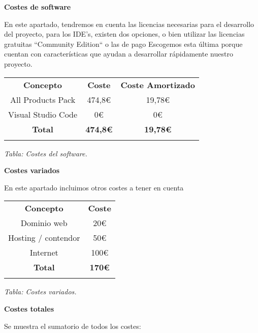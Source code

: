 \textbf{Costes de software}

En este apartado, tendremos en cuenta las licencias necesarias para el desarrollo del proyecto, para los IDE's, existen
dos opciones, o bien utilizar las licencias gratuitas ``Community Edition`` o las de pago\cite{jetbrainsPrecios}
Escogemos esta última porque cuentan con características que ayudan a desarrollar rápidamente nuestro proyecto.

\begin{center}
    \begin{tabular}{| c | c | c |}\hline
    \Xhline{2\arrayrulewidth}
    \textbf{Concepto} & \textbf{Coste} & \textbf{Coste Amortizado} \\ \Xhline{2\arrayrulewidth}
    All Products Pack & 474,8€ & 19,78€ \\ \hline
    Visual Studio Code & 0€ & 0€ \\ \hline
    \Xhline{2\arrayrulewidth}
    \textbf{Total} & \textbf{474,8€} & \textbf{19,78€} \\ \Xhline{2\arrayrulewidth}
    \end{tabular}


    \vspace{0.3em}
    \textit{Tabla: Costes del software.}
\end{center}

\textbf{Costes variados}

En este apartado incluimos otros costes a tener en cuenta

\begin{center}
    \begin{tabular}{| c | c |}\hline
    \Xhline{2\arrayrulewidth}
    \textbf{Concepto} & \textbf{Coste} \\ \Xhline{2\arrayrulewidth}
    Dominio web & 20€ \\ \hline
    Hosting / contendor & 50€\\ \hline
    Internet & 100€ \\ \hline
    \Xhline{2\arrayrulewidth}
    \textbf{Total} & \textbf{170€} \\ \Xhline{2\arrayrulewidth}
    \end{tabular}


    \vspace{0.3em}
    \textit{Tabla: Costes variados.}
\end{center}


\textbf{Costes totales}

Se muestra el sumatorio de todos los costes:

